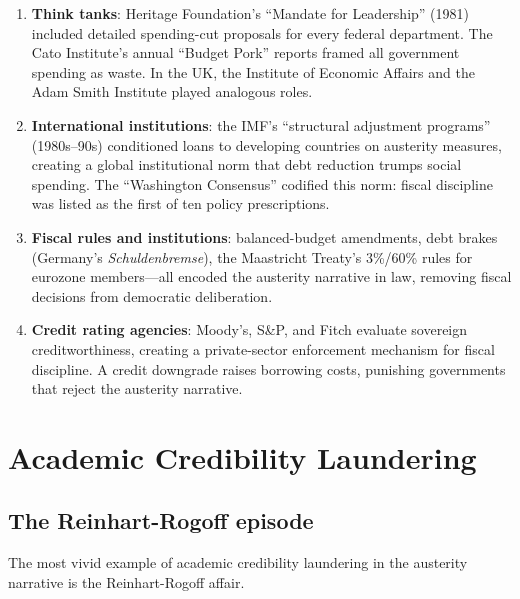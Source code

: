 \begin{enumerate}
  \item \textbf{Think tanks}: Heritage Foundation's ``Mandate for Leadership'' (1981) included detailed spending-cut proposals for every federal department. The Cato Institute's annual ``Budget Pork'' reports framed all government spending as waste. In the UK, the Institute of Economic Affairs and the Adam Smith Institute played analogous roles.

  \item \textbf{International institutions}: the IMF's ``structural adjustment programs'' (1980s--90s) conditioned loans to developing countries on austerity measures, creating a global institutional norm that debt reduction trumps social spending.
  The ``Washington Consensus'' codified this norm: fiscal discipline was listed as the first of ten policy prescriptions.

  \item \textbf{Fiscal rules and institutions}: balanced-budget amendments, debt brakes (Germany's \emph{Schuldenbremse}), the Maastricht Treaty's 3\%/60\% rules for eurozone members---all encoded the austerity narrative in law, removing fiscal decisions from democratic deliberation.

  \item \textbf{Credit rating agencies}: Moody's, S\&P, and Fitch evaluate sovereign creditworthiness, creating a private-sector enforcement mechanism for fiscal discipline. A credit downgrade raises borrowing costs, punishing governments that reject the austerity narrative.
\end{enumerate}

\section{Academic Credibility Laundering}
\label{sec:ch25-credibility}

\subsection{The Reinhart-Rogoff episode}

The most vivid example of academic credibility laundering in the austerity narrative is the Reinhart-Rogoff affair.

